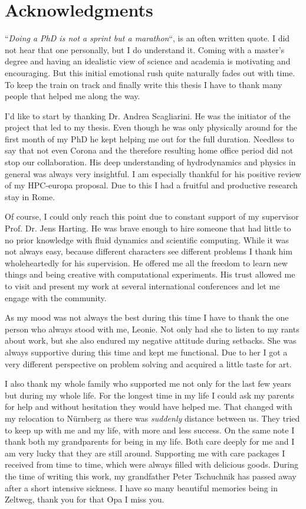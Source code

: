 \chapter{Acknowledgments}

``\textit{Doing a PhD is not a sprint but a marathon}``, is an often written quote.
I did not hear that one personally, but I do understand it.
Coming with a master’s degree and having an idealistic view of science and academia is motivating and encouraging.
But this initial emotional rush quite naturally fades out with time.
To keep the train on track and finally write this thesis I have to thank many people that helped me along the way.

I'd like to start by thanking Dr. Andrea Scagliarini. 
He was the initiator of the project that led to my thesis. 
Even though he was only physically around for the first month of my PhD he kept helping me out for the full duration.
Needless to say that not even Corona and the therefore resulting home office period did not stop our collaboration.
His deep understanding of hydrodynamics and physics in general was always very insightful.  
I am especially thankful for his positive review of my HPC-europa proposal.
Due to this I had a fruitful and productive research stay in Rome.

Of course, I could only reach this point due to constant support of my supervisor Prof. Dr. Jens Harting.
He was brave enough to hire someone that had little to no prior knowledge with fluid dynamics and scientific computing.
While it was not always easy, because different characters see different problems I thank him wholeheartedly for his supervision.
He offered me all the freedom to learn new things and being creative with computational experiments.
His trust allowed me to visit and present my work at several international conferences and let me engage with the community.

As my mood was not always the best during this time I have to thank the one person who always stood with me, Leonie.
Not only had she to listen to my rants about work, but she also endured my negative attitude during setbacks.
She was always supportive during this time and kept me functional.
Due to her I got a very different perspective on problem solving and acquired a little taste for art.

I also thank my whole family who supported me not only for the last few years but during my whole life.
For the longest time in my life I could ask my parents for help and without hesitation they would have helped me.
That changed with my relocation to Nürnberg as there was \textit{suddenly} distance between us.
They tried to keep up with me and my life, with more and less success.
On the same note I thank both my grandparents for being in my life.
Both care deeply for me and I am very lucky that they are still around.
Supporting me with care packages I received from time to time, which were always filled with delicious goods.
During the time of writing this work, my grandfather Peter Tschuchnik has passed away after a short intensive sickness.
I have so many beautiful memories being in Zeltweg, thank you for that Opa I miss you.  

